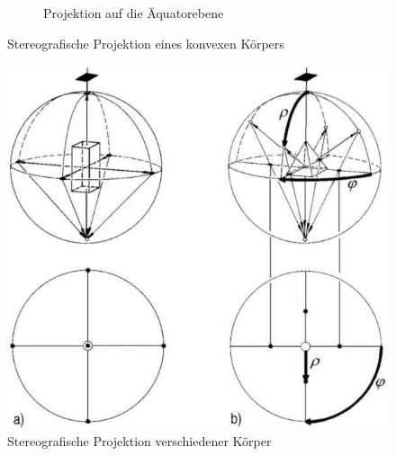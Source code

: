 \begin{figure}
\begin{subfigure}{0.4\textwidth}
	\caption{Projektion auf die Äquatorebene}
\end{subfigure}
\caption{Stereografische Projektion eines konvexen Körpers}
\end{figure}

\begin{figure}
	\centering
	\includegraphics[width=0.8\linewidth]{./pictures/stpr3.jpg}
	\caption{Stereografische Projektion verschiedener Körper}
\end{figure}

